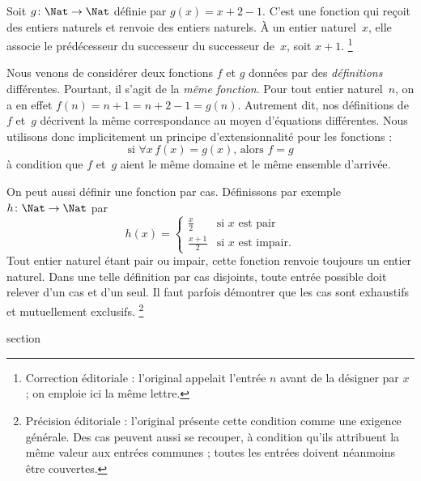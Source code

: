 \documentclass[11pt,a4paper,openany]{memoir}
\begin{document}
\begin{ex}
Soit $g \colon \Nat \to \Nat$ définie par $g(x) = x+2-1$.
C’est une fonction qui reçoit des entiers naturels et renvoie des
entiers naturels. À un entier naturel~$x$, elle associe le prédécesseur
du successeur du successeur de~$x$, soit $x+1$.
\footnote{Correction éditoriale : l’original appelait l’entrée
$n$ avant de la désigner par $x$ ; on emploie ici la même lettre.}
\end{ex}

\begin{explain}
Nous venons de considérer deux fonctions $f$ et $g$ données par des
\emph{définitions} différentes. Pourtant, il s’agit de la \emph{même fonction}.
Pour tout entier naturel~$n$, on a en effet
$f(n) = n+1 = n+2-1 = g(n)$. Autrement dit, nos définitions de $f$ et~$g$
décrivent la même correspondance au moyen d’équations différentes.
Nous utilisons donc implicitement un principe d’extensionnalité
pour les fonctions :
\[
  \text{si }\forall x\, f(x) = g(x)\text{, alors }f = g
\]
à condition que $f$ et~$g$ aient le même domaine et le même ensemble d’arrivée.
\end{explain}

\begin{ex}
On peut aussi définir une fonction par cas. Définissons par exemple
$h \colon \Nat \to \Nat$ par
\[
h(x) =
\begin{cases}
  \frac{x}{2} & \text{si $x$ est pair} \\
  \frac{x+1}{2} & \text{si $x$ est impair.}
\end{cases}
\]
Tout entier naturel étant pair ou impair, cette fonction renvoie toujours
un entier naturel. Dans une telle définition par cas disjoints, toute
entrée possible doit relever d’un cas et d’un seul. Il faut parfois
démontrer que les cas sont exhaustifs et mutuellement exclusifs.
\footnote{Précision éditoriale : l’original présente cette condition comme
une exigence générale. Des cas peuvent aussi se recouper, à condition
qu’ils attribuent la même valeur aux entrées communes ; toutes les entrées
doivent néanmoins être couvertes.}
\end{ex}


\endgroup



\begingroup
\expandafter\def\csname ol@sectioncs\endcsname{section}
\def\olfilename{function-kinds}
\end{document}
